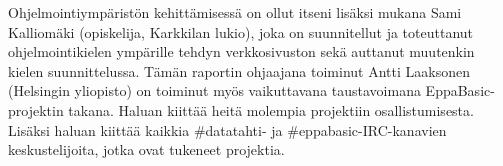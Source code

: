 Ohjelmointiympäristön kehittämisessä on
ollut itseni lisäksi mukana
Sami Kalliomäki (opiskelija, Karkkilan lukio),
joka on suunnitellut ja toteuttanut
ohjelmointikielen ympärille tehdyn verkkosivuston
sekä auttanut muutenkin kielen suunnittelussa.
Tämän raportin ohjaajana toiminut
Antti Laaksonen (Helsingin yliopisto)
on toiminut myös vaikuttavana
taustavoimana EppaBasic-projektin takana.
Haluan kiittää heitä molempia
projektiin osallistumisesta.
Lisäksi haluan kiittää kaikkia
\#datatahti- ja
\#eppabasic-IRC-kanavien keskustelijoita,
jotka ovat tukeneet projektia.